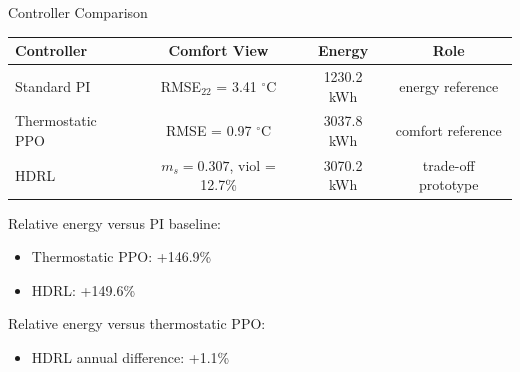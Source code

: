 \documentclass[aspectratio=169,11pt]{beamer}
\newcommand{\degc}{\ensuremath{^\circ\mathrm{C}}}
\begin{document}
\begin{frame}{Controller Comparison}
  \small
  \begin{tabular}{lccc}
    \toprule
    Controller & Comfort View & Energy & Role \\
    \midrule
    Standard PI & RMSE$_{22}$ = 3.41 \degc{} & 1230.2 kWh & energy reference \\
    Thermostatic PPO & RMSE = 0.97 \degc{} & 3037.8 kWh & comfort reference \\
    HDRL & $m_s = 0.307$, viol = 12.7\% & 3070.2 kWh & trade-off prototype \\
    \bottomrule
  \end{tabular}

  \vspace{0.75em}
  Relative energy versus PI baseline:
  \begin{itemize}
    \item Thermostatic PPO: +146.9\%
    \item HDRL: +149.6\%
  \end{itemize}

  \vspace{0.5em}
  Relative energy versus thermostatic PPO:
  \begin{itemize}
    \item HDRL annual difference: +1.1\%
  \end{itemize}
\end{frame}
\end{document}
